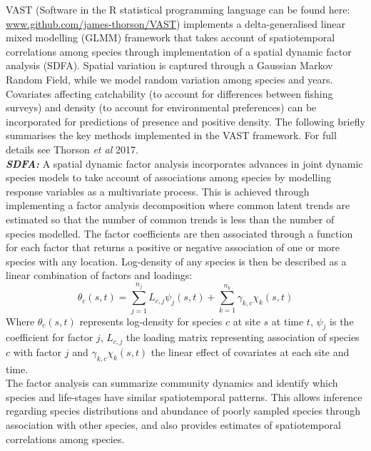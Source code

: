 \documentclass[fleqn,10pt]{wlscirep}
\begin{document}
\begin{linenumbers}
VAST (Software in the R statistical programming language can be found here:
\url{www.github.com/james-thorson/VAST}) implements a delta-generalised linear
mixed modelling (GLMM) framework that takes account of spatiotemporal
correlations among species through implementation of a spatial dynamic factor
analysis (SDFA). Spatial variation is captured through a Gaussian Markov Random
Field, while we model random variation among species and years. Covariates
affecting catchability (to account for differences between fishing surveys) and
density (to account for environmental preferences) can be incorporated for
predictions of presence and positive density. The following briefly summarises
the key methods implemented in the VAST framework. For full details see Thorson
\textit{et al} 2017\cite{Thorson2017}.\\

\textbf{\textit{SDFA:}} A spatial dynamic factor analysis incorporates advances
in joint dynamic species models\cite{Thorson2017} to take account of
associations among species by modelling response variables as a multivariate
process. This is achieved through implementing a factor analysis decomposition
where common latent trends are estimated so that the number of common trends is
less than the number of species modelled. The factor coefficients are then
associated through a function for each factor that returns a positive or
negative association of one or more species with any location. Log-density of
any species is then be described as a linear combination of factors and
loadings: \begin{equation} \theta_{c}(s,t) = \sum_{j=1}^{n_{j}}
	L_{c,j}\psi_{j}(s,t) +\sum_{k=1}^{n_{k}} \gamma_{k,c}\chi_{k}(s,t)
\end{equation} Where $\theta_{c}(s,t)$ represents log-density for species $c$
at site $s$ at time $t$, $\psi_{j}$ is the coefficient for factor $j$,
$L_{c,j}$ the loading matrix representing association of species $c$ with
factor $j$ and $\gamma_{k,c}\chi_{k}(s,t)$ the linear effect of covariates at
each site and time\cite{Thorson2016b}. \\

The factor analysis can summarize community dynamics and identify which species
and life-stages have similar spatiotemporal patterns. This allows inference
regarding species distributions and abundance of poorly sampled species through
association with other species, and also provides estimates of spatiotemporal
correlations among species\cite{Thorson2016b}.\\


\end{linenumbers}
\end{document}

